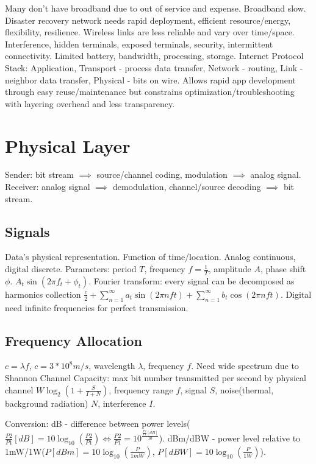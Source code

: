 \documentclass[8pt]{extarticle}
\begin{document}
\begin{multicols}{2}

Many don't have broadband due to out of service and expense. Broadband slow. Disaster recovery network needs rapid deployment, efficient resource/energy, flexibility, resilience. Wireless links are less reliable and vary over time/space. Interference, hidden terminals, exposed terminals, security, intermittent connectivity. Limited battery, bandwidth, processing, storage. Internet Protocol Stack: Application, Transport - process data transfer, Network - routing, Link - neighbor data transfer, Physical - bits on wire. Allows rapid app development through easy reuse/maintenance but constrains optimization/troubleshooting with layering overhead and less transparency.

\section{Physical Layer}

Sender: bit stream $\implies$ source/channel coding, modulation $\implies$ analog signal. Receiver: analog signal $\implies$ demodulation, channel/source decoding $\implies$ bit stream.

\subsection{Signals} 

Data's physical representation. Function of time/location. Analog continuous, digital discrete. Parameters: period $T$, frequency $f = \frac{1}{T}$, amplitude $A$, phase shift $\phi$. $A_t\sin{(2\pi{f_t}+\phi_t)}$. Fourier transform: every signal can be decomposed as harmonics collection $\frac{c}{2}+\sum_{n=1}^{\infty}a_t\sin{(2\pi{n}ft)} + \sum_{n=1}^{\infty}b_t\cos{(2\pi{n}ft)}$. Digital need infinite frequencies for perfect transmission.

\subsection{Frequency Allocation}
 
$c=\lambda{f}$, $c=3*10^8m/s$, wavelength $\lambda$, frequency $f$. Need wide spectrum due to Shannon Channel Capacity: max bit number transmitted per second by physical channel $W\log_2{(1+\frac{S}{I+N})}$, frequency range $f$, signal $S$, noise(thermal, background radiation) $N$, interference $I$. 

Conversion: dB - difference between power levels($\frac{P2}{P1}[dB]=10\log_{10}{(\frac{P2}{P1})} \iff \frac{P2}{P1}=10^{\frac{\frac{P2}{P1}[dB]}{10}}$). dBm/dBW - power level relative to 1mW/1W($P[dBm] = 10\log_{10}{(\frac{P}{1mW})}$, $P[dBW] = 10\log_{10}{(\frac{P}{1W})}$).


\end{multicols}
\end{document}
